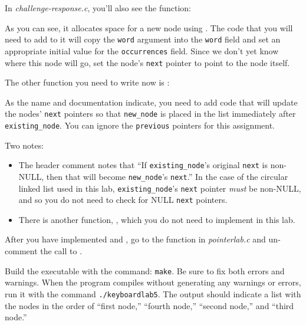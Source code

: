 In \textit{challenge-response.c}, you'll also see the  function:



As you can see, it allocates space for a new node using .
The code that you will need to add to it will copy the \lstinline{word} argument into the \lstinline{word} field and set an appropriate initial value for the \lstinline{occurrences} field.
Since we don't yet know where this node will go, set the node's \lstinline{next} pointer to point to the node itself.

The other function you need to write now is :



As the name and documentation indicate, you need to add code that will update the nodes' \lstinline{next} pointers so that \lstinline{new_node} is placed in the list immediately after \lstinline{existing_node}.
You can ignore the \lstinline{previous} pointers for this assignment.

Two notes:
\begin{itemize}
    \item The header comment notes that ``If \lstinline{existing_node}'s original \lstinline{next} is non-NULL, then that will become \lstinline{new_node}'s \lstinline{next}.''
            In the case of the circular linked list used in this lab, \lstinline{existing_node}'s \lstinline{next} pointer \textit{must} be non-NULL, and so you do not need to check for NULL \lstinline{next} pointers.
    \item There is another function, , which you do not need to implement in this lab.
\end{itemize}

After you have implemented  and , go to the  function in \textit{pointerlab.c} and un-comment the call to .



Build the executable with the command: \texttt{make}.
Be sure to fix both errors and warnings.
When the program compiles without generating any warnings or errors, run it with the command \texttt{./keyboardlab5}.
The output should indicate a list with the nodes in the order of ``first node,'' ``fourth node,'' ``second node,'' and ``third node.''

